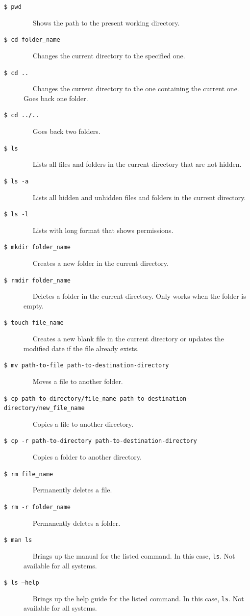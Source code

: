 \documentclass[11pt]{article}
\begin{document}
\begin{description}
	\item[\texttt{\$ pwd}] $\quad$ Shows the path to the present working directory. 
	
	\item[\texttt{\$ cd folder\_name}] $\quad$ Changes the current directory to the specified one.
	
	\item[\texttt{\$ cd ..}] $\quad$ Changes the current directory to the one containing the current one. Goes back one folder.
	
	\item[\texttt{\$ cd ../..}] $\quad$ Goes back two folders.
	
	\item[\texttt{\$ ls}] $\quad$ Lists all files and folders in the current directory that are not hidden. 
	
	\item[\texttt{\$ ls -a}] $\quad$ Lists all hidden and unhidden files and folders in the current directory. 
	
	\item[\texttt{\$ ls -l}] $\quad$ Lists with long format that shows permissions.
	
	\item[\texttt{\$ mkdir folder\_name}] $\quad$ Creates a new folder in the current directory. 
	
	\item[\texttt{\$ rmdir folder\_name}] $\quad$ Deletes a folder in the current directory. Only works when the folder is empty. 
	
	\item[\texttt{\$ touch file\_name}] $\quad$ Creates a new blank file in the current directory or updates the modified date if the file already exists.
	
	\item[\texttt{\$ mv path-to-file path-to-destination-directory}] $\quad$ Moves a file to another folder. 
	
	\item[\texttt{\$ cp path-to-directory/file\_name path-to-destination-directory/new\_file\_name}] $\quad$ Copies a file to another directory. 
	
	\item[\texttt{\$ cp -r path-to-directory path-to-destination-directory}] $\quad$ Copies a folder to another directory. 
	
	\item[\texttt{\$ rm file\_name}] $\quad$ Permanently deletes a file.
	
	\item[\texttt{\$ rm -r folder\_name}] $\quad$ Permanently deletes a folder.
	
	\item[\texttt{\$ man ls}] $\quad$ Brings up the manual for the listed command. In this case, \texttt{ls}. Not available for all systems.
	
	\item[\texttt{\$ ls --help}] $\quad$ Brings up the help guide for the listed command. In this case, \texttt{ls}. Not available for all systems.
\end{description}
\end{document}

